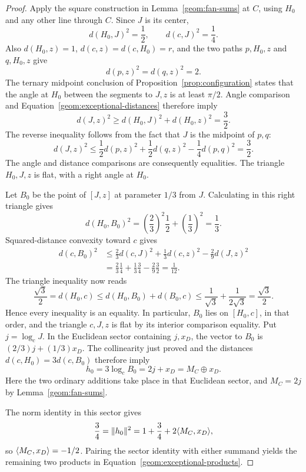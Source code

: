\begin{proof}
Apply the square construction in Lemma~\ref{geom:fan-sums} at $C$,
using $H_0$ and any other line through $C$.  Since $J$ is its center,
\begin{equation}
 d(H_0,J)^2=\frac12,\qquad d(c,J)^2=\frac14.
 \label{geom:exceptional-distances}
\end{equation}
Also $d(H_0,z)=1$, $d(c,z)=d(c,H_0)=r$, and the two paths
$p,H_0,z$ and $q,H_0,z$ give
\[
 d(p,z)^2=d(q,z)^2=2.
\]
The ternary midpoint conclusion of
Proposition~\ref{prop:configuration} states that the angle at $H_0$
between the segments to $J,z$ is at least $\pi/2$.  Angle comparison
and Equation~\eqref{geom:exceptional-distances} therefore imply
\[
 d(J,z)^2\geq d(H_0,J)^2+d(H_0,z)^2=\frac32.
\]
The reverse inequality follows from the fact that $J$ is the midpoint
of $p,q$:
\[
 d(J,z)^2\leq\frac12d(p,z)^2+\frac12d(q,z)^2
                    -\frac14d(p,q)^2=\frac32.
\]
The angle and distance comparisons are consequently equalities.
The triangle $H_0,J,z$ is flat, with a right angle at $H_0$.

Let $B_0$ be the point of $[J,z]$ at parameter $1/3$ from $J$.
Calculating in this right triangle gives
\[
 d(H_0,B_0)^2
 =\left(\frac23\right)^2\frac12
  +\left(\frac13\right)^2=\frac13.
\]
Squared-distance convexity toward $c$ gives
\begin{align*}
 d(c,B_0)^2
 &\leq\frac23 d(c,J)^2+\frac13d(c,z)^2
                 -\frac29d(J,z)^2\\
 &=\frac23\frac14+\frac13\frac34-\frac29\frac32
 =\frac1{12}.
\end{align*}
The triangle inequality now reads
\[
 \frac{\sqrt3}{2}=d(H_0,c)
 \leq d(H_0,B_0)+d(B_0,c)
 \leq\frac1{\sqrt3}+\frac1{2\sqrt3}
 =\frac{\sqrt3}{2}.
\]
Hence every inequality is an equality.  In particular, $B_0$ lies on
$[H_0,c]$, in that order, and the triangle $c,J,z$ is flat by its
interior comparison equality.  Put $j=\log_c J$.  In the Euclidean
sector containing $j,x_D$, the vector to $B_0$ is
$(2/3)j+(1/3)x_D$.  The collinearity just proved and the distances
$d(c,H_0)=3d(c,B_0)$ therefore imply
\[
 h_0=3\log_c B_0=2j+x_D=M_C\oplus x_D.
\]
Here the two ordinary additions take place in that Euclidean sector,
and $M_C=2j$ by Lemma~\ref{geom:fan-sums}.

The norm identity in this sector gives
\[
 \frac34=\lVert h_0\rVert^2
 =1+\frac34+2\langle M_C,x_D\rangle,
\]
so $\langle M_C,x_D\rangle=-1/2$.  Pairing the sector identity with either
summand yields the remaining two products in
Equation~\eqref{geom:exceptional-products}.
\end{proof}

